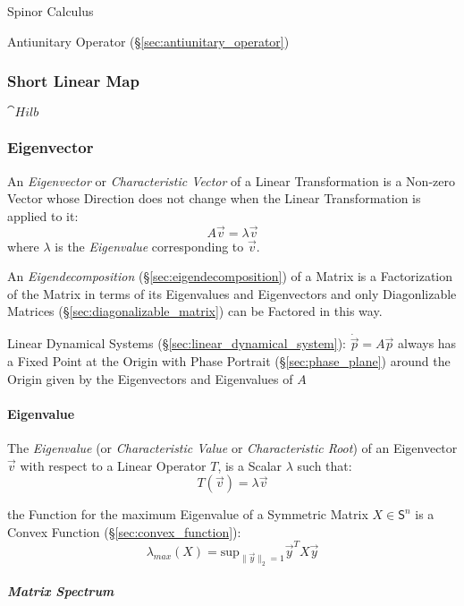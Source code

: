 Spinor Calculus

\fist Antiunitary Operator (\S\ref{sec:antiunitary_operator})



\subsubsection{Short Linear Map}\label{sec:short_linear}

$\cat{Hilb}$



\subsubsection{Eigenvector}\label{sec:eigenvector}

An \emph{Eigenvector} or \emph{Characteristic Vector} of a Linear
Transformation is a Non-zero Vector whose Direction does not change when the
Linear Transformation is applied to it:
\[
  A\vec{v} = \lambda\vec{v}
\]
where $\lambda$ is the \emph{Eigenvalue} corresponding to $\vec{v}$.

An \emph{Eigendecomposition} (\S\ref{sec:eigendecomposition}) of a Matrix is a
Factorization of the Matrix in terms of its Eigenvalues and Eigenvectors and
only Diagonlizable Matrices (\S\ref{sec:diagonalizable_matrix}) can be Factored
in this way.

\fist Linear Dynamical Systems (\S\ref{sec:linear_dynamical_system}):
$\dot{\vec{p}} = A\vec{p}$ always has a Fixed Point at the Origin with Phase
Portrait (\S\ref{sec:phase_plane}) around the Origin given by the Eigenvectors
and Eigenvalues of $A$



\paragraph{Eigenvalue}\label{sec:eigenvalue}\hfill

The \emph{Eigenvalue} (or \emph{Characteristic Value} or \emph{Characteristic
  Root}) of an Eigenvector $\vec{v}$ with respect to a Linear Operator $T$, is a
Scalar $\lambda$ such that:
\[
  T(\vec{v}) = \lambda\vec{v}
\]

the Function for the maximum Eigenvalue of a Symmetric Matrix $X \in
\mathsf{S}^n$ is a Convex Function (\S\ref{sec:convex_function}):
\[
  \lambda_{max}(X) = \mathrm{sup}_{\|\vec{y}\|_2=1} \vec{y}^T X \vec{y}
\]



\subparagraph{Matrix Spectrum}\label{sec:matrix_spectrum}\hfill

